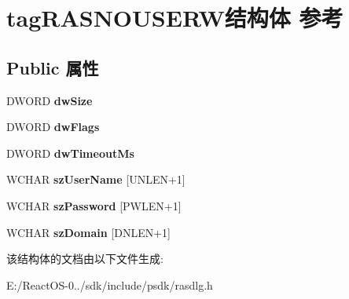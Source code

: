 \hypertarget{structtag_r_a_s_n_o_u_s_e_r_w}{}\section{tag\+R\+A\+S\+N\+O\+U\+S\+E\+R\+W结构体 参考}
\label{structtag_r_a_s_n_o_u_s_e_r_w}
\subsection*{Public 属性}
\begin{DoxyCompactItemize}
\item 
\mbox{\label{structtag_r_a_s_n_o_u_s_e_r_w_a5fd3c14315940f41dbc0e9517cd5e392}} 
D\+W\+O\+RD {\bfseries dw\+Size}
\item 
\mbox{\label{structtag_r_a_s_n_o_u_s_e_r_w_a8f25f205498cbe763fe7ad98c0b48746}} 
D\+W\+O\+RD {\bfseries dw\+Flags}
\item 
\mbox{\label{structtag_r_a_s_n_o_u_s_e_r_w_a3f0c4266292f69fc46764e940081de5c}} 
D\+W\+O\+RD {\bfseries dw\+Timeout\+Ms}
\item 
\mbox{\label{structtag_r_a_s_n_o_u_s_e_r_w_a98e350882977d523c08abc8865bacf53}} 
W\+C\+H\+AR {\bfseries sz\+User\+Name} \mbox{[}U\+N\+L\+EN+1\mbox{]}
\item 
\mbox{\label{structtag_r_a_s_n_o_u_s_e_r_w_a41e6be8594c8863885e277273658cbb9}} 
W\+C\+H\+AR {\bfseries sz\+Password} \mbox{[}P\+W\+L\+EN+1\mbox{]}
\item 
\mbox{\label{structtag_r_a_s_n_o_u_s_e_r_w_a9898cb81b871e83c623f5201b7970604}} 
W\+C\+H\+AR {\bfseries sz\+Domain} \mbox{[}D\+N\+L\+EN+1\mbox{]}
\end{DoxyCompactItemize}


该结构体的文档由以下文件生成\+:\begin{DoxyCompactItemize}
\item 
E\+:/\+React\+O\+S-\/0../sdk/include/psdk/rasdlg.\+h\end{DoxyCompactItemize}

